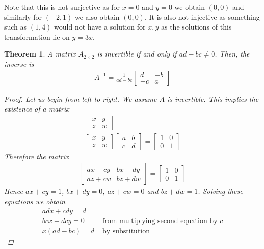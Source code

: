 \documentclass[a4paper]{article}
\theoremstyle{plain}
\newtheorem{thm}{Theorem}[section]
\theoremstyle{definition}
\theoremstyle{remark}
\begin{document}
Note that this is not surjective as for $x=0$ and $y = 0$ we obtain $(0,0)$ and similarly for $(-2,1)$ we also obtain $(0,0)$. It is also not injective as something such as $(1,4)$ would not have a solution for $x,y$ as the solutions of this transformation lie on $y=3x$.\\
\begin{thm}
	A matrix $A_{2\times 2}$  is invertible if and only if $ad-bc \neq 0$. Then, the inverse is  
	\begin{align*}
		A^{-1} = \frac{1}{ad-bc}\begin{bmatrix} d & -b \\ -c & a \end{bmatrix} 
	\end{align*}
	\begin{proof}
		Let us begin from left to right. We assume $A$ is invertible. This implies the existence of a matrix 
		\begin{align*}
			\begin{bmatrix} x & y \\ z & w \end{bmatrix} \\
			\begin{bmatrix} x & y \\ z & w \end{bmatrix}  \begin{bmatrix} a & b \\ c & d \end{bmatrix}  = \begin{bmatrix} 1 & 0 \\ 0 & 1 \end{bmatrix} 
		\end{align*}
		Therefore the matrix
		\begin{align*}
			\begin{bmatrix} ax+cy & bx + dy \\ az + cw & bz + dw \end{bmatrix}  = \begin{bmatrix} 1 & 0 \\ 0 & 1 \end{bmatrix} 
		\end{align*}
		Hence $ax+cy = 1$, $bx + dy = 0$, $az+cw = 0$ and $bz+dw = 1$. Solving these equations we obtain
		\begin{align*}
			adx+cdy = d& \\
			bcx+dcy = 0& \text{ from multiplying second equation by $c$}\\
			x(ad-bc) = d& \text{ by substitution}

\end{align*}
\end{proof}
\end{thm}
\end{document}
